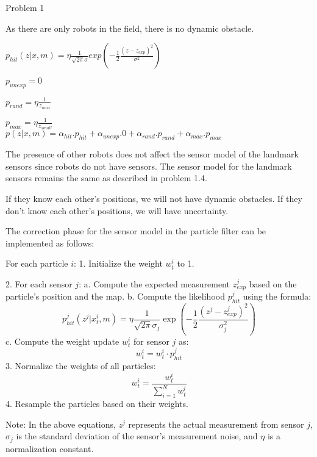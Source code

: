 \documentclass{article}
\begin{document}
\begin{problem}{Problem 1}
\begin{problem}{1.4}
As there are only robots in the field, there is no dynamic obstacle.

$p_{hit} (z|x,m) = \eta \frac{1}{\sqrt{2\pi}\sigma }exp(-\frac{1}{2} \frac{(z-z_{exp})^2}{\sigma^2})$

$p_{unexp} = 0$

$p_{rand} = \eta\frac{1}{z_{max}}$

$p_{max} = \eta \frac{1}{z_{small}}$\\

$p(z|x,m) = \alpha_{hit}.p_{hit} + \alpha_{unexp}.0 +\alpha_{rand}.p_{rand}+\alpha_{max} .p_{max}$

\end{problem}

\begin{problem}{1.5}
The presence of other robots does not affect the sensor model of the landmark sensors since robots do not have sensors. The sensor model for the landmark sensors remains the same as described in problem 1.4.
\end{problem}

\begin{problem}{1.6}
If they know each other's positions, we will not have dynamic obstacles. If they don't know each other's positions, we will have uncertainty.
\end{problem}

\begin{problem}{1.7}
The correction phase for the sensor model in the particle filter can be implemented as follows:

For each particle $i$:
1. Initialize the weight $w_t^i$ to 1.


2. For each sensor $j$:
a. Compute the expected measurement $z_{exp}^j$ based on the particle's position and the map.
b. Compute the likelihood $p_{hit}^j$ using the formula:
\[
    p_{hit}^j(z^j|x_t^i,m) = \eta \frac{1}{\sqrt{2\pi}\sigma_j} \exp\left(-\frac{1}{2} \frac{(z^j-z_{exp}^j)^2}{\sigma_j^2}\right)
\]
c. Compute the weight update $w_t^i$ for sensor $j$ as:
\[
    w_t^i = w_t^i \cdot p_{hit}^j
\]
3. Normalize the weights of all particles:
\[
    w_t^i = \frac{w_t^i}{\sum_{i=1}^{N} w_t^i}
\]
4. Resample the particles based on their weights.

Note: In the above equations, $z^j$ represents the actual measurement from sensor $j$, $\sigma_j$ is the standard deviation of the sensor's measurement noise, and $\eta$ is a normalization constant.


\end{problem}
\end{problem}
\end{document}
